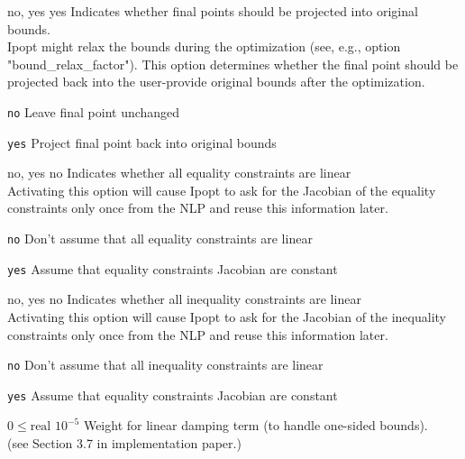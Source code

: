 %
{\ttfamily no, yes}%
{yes}%
{Indicates whether final points should be projected into original bounds.\\
Ipopt might relax the bounds during the optimization (see, e.g., option "bound\_relax\_factor").  This option determines whether the final point should be projected back into the user-provide original bounds after the optimization.}%
{\begin{list}{}{
\setlength{\parsep}{0em}
\setlength{\leftmargin}{5ex}
\setlength{\labelwidth}{2ex}
\setlength{\itemindent}{0ex}
\setlength{\topsep}{0pt}}
\item[\texttt{no}] Leave final point unchanged
\item[\texttt{yes}] Project final point back into original bounds
\end{list}
}

%
{\ttfamily no, yes}%
{no}%
{Indicates whether all equality constraints are linear\\
Activating this option will cause Ipopt to ask for the Jacobian of the equality constraints only once from the NLP and reuse this information later.}%
{\begin{list}{}{
\setlength{\parsep}{0em}
\setlength{\leftmargin}{5ex}
\setlength{\labelwidth}{2ex}
\setlength{\itemindent}{0ex}
\setlength{\topsep}{0pt}}
\item[\texttt{no}] Don't assume that all equality constraints are linear
\item[\texttt{yes}] Assume that equality constraints Jacobian are constant
\end{list}
}

%
{\ttfamily no, yes}%
{no}%
{Indicates whether all inequality constraints are linear\\
Activating this option will cause Ipopt to ask for the Jacobian of the inequality constraints only once from the NLP and reuse this information later.}%
{\begin{list}{}{
\setlength{\parsep}{0em}
\setlength{\leftmargin}{5ex}
\setlength{\labelwidth}{2ex}
\setlength{\itemindent}{0ex}
\setlength{\topsep}{0pt}}
\item[\texttt{no}] Don't assume that all inequality constraints are linear
\item[\texttt{yes}] Assume that equality constraints Jacobian are constant
\end{list}
}

%
{$0\leq\textrm{real}$}%
{$10^{- 5}$}%
{Weight for linear damping term (to handle one-sided bounds).\\
(see Section 3.7 in implementation paper.)}%
{}

